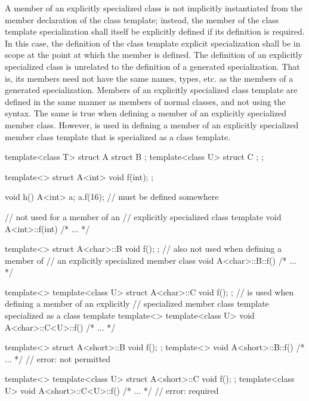 \pnum
A member of an explicitly specialized class is not implicitly
instantiated from the member declaration of the class template;
instead, the member of the class template specialization shall itself be
explicitly defined if its definition is required.
In this case, the definition of the class template explicit specialization
shall be in scope at the point at which the member is defined.
The definition of an explicitly specialized class is unrelated to the
definition of a generated specialization.
That is, its members need
not have the same names, types, etc. as the members of a generated
specialization.
Members of an explicitly specialized
class template are defined in the same manner as members of normal classes, and
not using the  syntax.
The same is true when defining a member of an explicitly specialized member
class. However,  is used in defining a member of an explicitly
specialized member class template that is specialized as a class template.
\enterexample

\begin{codeblock}
template<class T> struct A {
  struct B { };
  template<class U> struct C { };
};

template<> struct A<int> {
  void f(int);
};

void h() {
  A<int> a;
  a.f(16);          //  must be defined somewhere
}

//  not used for a member of an
// explicitly specialized class template
void A<int>::f(int) { /* ... */ }

template<> struct A<char>::B {
  void f();
};
//  also not used when defining a member of
// an explicitly specialized member class
void A<char>::B::f() { /* ... */ }

template<> template<class U> struct A<char>::C {
  void f();
};
//  is used when defining a member of an explicitly
// specialized member class template specialized as a class template
template<>
template<class U> void A<char>::C<U>::f() { /* ... */ }

template<> struct A<short>::B {
  void f();
};
template<> void A<short>::B::f() { /* ... */ }  // error:  not permitted

template<> template<class U> struct A<short>::C {
  void f();
};
template<class U> void A<short>::C<U>::f() { /* ... */ }  // error:  required
\end{codeblock}
\exitexample


